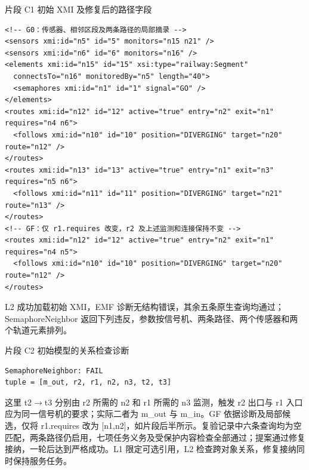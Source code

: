 \documentclass[pdflatex,iicol,sn-mathphys-num]{sn-jnl}
\begin{document}
\par\noindent\begin{minipage}{\columnwidth}
片段 C1 初始 XMI 及修复后的路径字段\par
\begin{Verbatim}[fontsize=\footnotesize,breaklines=true,breakanywhere=true,breaksymbolleft={},frame=lines,framesep=3mm,rulecolor=\color{lightgray}]
<!-- G0：传感器、相邻区段及两条路径的局部摘录 -->
<sensors xmi:id="n5" id="5" monitors="n15 n21" />
<sensors xmi:id="n6" id="6" monitors="n16" />
<elements xmi:id="n15" id="15" xsi:type="railway:Segment"
  connectsTo="n16" monitoredBy="n5" length="40">
  <semaphores xmi:id="n1" id="1" signal="GO" />
</elements>
<routes xmi:id="n12" id="12" active="true" entry="n2" exit="n1" requires="n4 n6">
  <follows xmi:id="n10" id="10" position="DIVERGING" target="n20" route="n12" />
</routes>
<routes xmi:id="n13" id="13" active="true" entry="n1" exit="n3" requires="n5 n6">
  <follows xmi:id="n11" id="11" position="DIVERGING" target="n21" route="n13" />
</routes>
<!-- GF：仅 r1.requires 改变，r2 及上述监测和连接保持不变 -->
<routes xmi:id="n12" id="12" active="true" entry="n2" exit="n1" requires="n4 n5">
  <follows xmi:id="n10" id="10" position="DIVERGING" target="n20" route="n12" />
</routes>
\end{Verbatim}
\end{minipage}\par

L2 成功加载初始 XMI，EMF 诊断无结构错误，其余五条原生查询均通过；SemaphoreNeighbor 返回下列违反，参数按信号机、两条路径、两个传感器和两个轨道元素排列。


\par\noindent\begin{minipage}{\columnwidth}
片段 C2 初始模型的关系检查诊断\par
\begin{Verbatim}[fontsize=\footnotesize,breaklines=true,breakanywhere=true,breaksymbolleft={},frame=lines,framesep=3mm,rulecolor=\color{lightgray}]
SemaphoreNeighbor: FAIL
tuple = [m_out, r2, r1, n2, n3, t2, t3]
\end{Verbatim}
\end{minipage}\par

这里 t2\ensuremath{\rightarrow}t3 分别由 r2 所需的 n2 和 r1 所需的 n3 监测，触发 r2 出口与 r1 入口应为同一信号机的要求；实际二者为 m\_out 与 m\_in。GF 依据诊断及局部候选，仅将 r1.requires 改为 [n1,n2]，如片段后半所示。复验记录中六条查询均为空匹配，两条路径仍启用，七项任务义务及受保护内容检查全部通过；提案通过修复接纳，一轮后达到严格成功。L1 限定可选引用，L2 检查跨对象关系，修复接纳同时保持服务任务。
\end{document}
